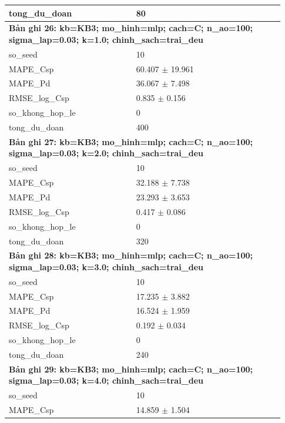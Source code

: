 \begin{longtable}{p{0.43\linewidth}p{0.50\linewidth}}
tong\_\allowbreak du\_\allowbreak doan & 80 \\
\midrule
\multicolumn{2}{p{0.95\linewidth}}{\textbf{Bản ghi 26: kb=KB3; mo\_hinh=mlp; cach=C; n\_ao=100; sigma\_lap=0.03; k=1.0; chinh\_sach=trai\_deu}} \\
so\_\allowbreak seed & 10 \\
MAPE\_\allowbreak Csp & 60.407 $\pm$ 19.961 \\
MAPE\_\allowbreak Pd & 36.067 $\pm$ 7.498 \\
RMSE\_\allowbreak log\_\allowbreak Csp & 0.835 $\pm$ 0.156 \\
so\_\allowbreak khong\_\allowbreak hop\_\allowbreak le & 0 \\
tong\_\allowbreak du\_\allowbreak doan & 400 \\
\midrule
\multicolumn{2}{p{0.95\linewidth}}{\textbf{Bản ghi 27: kb=KB3; mo\_hinh=mlp; cach=C; n\_ao=100; sigma\_lap=0.03; k=2.0; chinh\_sach=trai\_deu}} \\
so\_\allowbreak seed & 10 \\
MAPE\_\allowbreak Csp & 32.188 $\pm$ 7.738 \\
MAPE\_\allowbreak Pd & 23.293 $\pm$ 3.653 \\
RMSE\_\allowbreak log\_\allowbreak Csp & 0.417 $\pm$ 0.086 \\
so\_\allowbreak khong\_\allowbreak hop\_\allowbreak le & 0 \\
tong\_\allowbreak du\_\allowbreak doan & 320 \\
\midrule
\multicolumn{2}{p{0.95\linewidth}}{\textbf{Bản ghi 28: kb=KB3; mo\_hinh=mlp; cach=C; n\_ao=100; sigma\_lap=0.03; k=3.0; chinh\_sach=trai\_deu}} \\
so\_\allowbreak seed & 10 \\
MAPE\_\allowbreak Csp & 17.235 $\pm$ 3.882 \\
MAPE\_\allowbreak Pd & 16.524 $\pm$ 1.959 \\
RMSE\_\allowbreak log\_\allowbreak Csp & 0.192 $\pm$ 0.034 \\
so\_\allowbreak khong\_\allowbreak hop\_\allowbreak le & 0 \\
tong\_\allowbreak du\_\allowbreak doan & 240 \\
\midrule
\multicolumn{2}{p{0.95\linewidth}}{\textbf{Bản ghi 29: kb=KB3; mo\_hinh=mlp; cach=C; n\_ao=100; sigma\_lap=0.03; k=4.0; chinh\_sach=trai\_deu}} \\
so\_\allowbreak seed & 10 \\
MAPE\_\allowbreak Csp & 14.859 $\pm$ 1.504 \\

\end{longtable}
